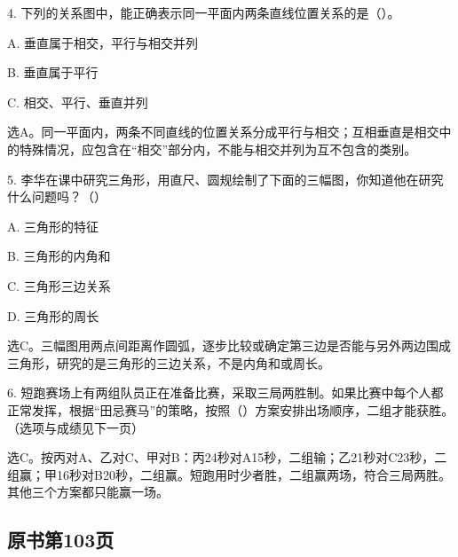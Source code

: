 4. 下列的关系图中，能正确表示同一平面内两条直线位置关系的是（\hspace{1.8em}）。\par
\noindent A. 垂直属于相交，平行与相交并列\par
\noindent B. 垂直属于平行\par
\noindent C. 相交、平行、垂直并列\par
{}
\begin{BookAnswer}
选A。同一平面内，两条不同直线的位置关系分成平行与相交；互相垂直是相交中的特殊情况，应包含在“相交”部分内，不能与相交并列为互不包含的类别。
\end{BookAnswer}

5. 李华在课中研究三角形，用直尺、圆规绘制了下面的三幅图，你知道他在研究什么问题吗？（\hspace{1.8em}）\par
\noindent A. 三角形的特征\par
\noindent B. 三角形的内角和\par
\noindent C. 三角形三边关系\par
\noindent D. 三角形的周长\par
{}
\begin{BookAnswer}
选C。三幅图用两点间距离作圆弧，逐步比较或确定第三边是否能与另外两边围成三角形，研究的是三角形的三边关系，不是内角和或周长。
\end{BookAnswer}

6. 短跑赛场上有两组队员正在准备比赛，采取三局两胜制。如果比赛中每个人都正常发挥，根据“田忌赛马”的策略，按照（\hspace{1.8em}）方案安排出场顺序，二组才能获胜。（选项与成绩见下一页）\par
\begin{BookAnswer}
选C。按丙对A、乙对C、甲对B：丙24秒对A15秒，二组输；乙21秒对C23秒，二组赢；甲16秒对B20秒，二组赢。短跑用时少者胜，二组赢两场，符合三局两胜。其他三个方案都只能赢一场。
\end{BookAnswer}



\subsection*{原书第103页}

